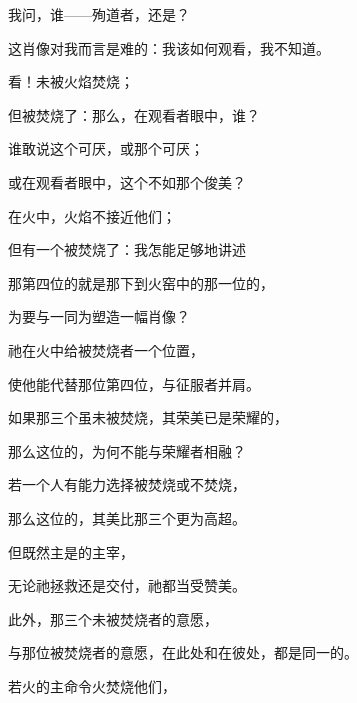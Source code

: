 我问，谁——殉道者，还是？\par

这肖像对我而言是难的：我该如何观看，我不知道。\par

看！未被火焰焚烧；\par

但被焚烧了：那么，在观看者眼中，谁？\par

谁敢说这个可厌，或那个可厌；\par

或在观看者眼中，这个不如那个俊美？\par

在火中，火焰不接近他们；\par

但有一个被焚烧了：我怎能足够地讲述\par

那第四位的就是那下到火窑中的那一位的，\par

为要与一同为塑造一幅肖像？\par

祂在火中给被焚烧者一个位置，\par

使他能代替那位第四位，与征服者并肩。\par

如果那三个虽未被焚烧，其荣美已是荣耀的，\par

那么这位的，为何不能与荣耀者相融？\par

若一个人有能力选择被焚烧或不焚烧，\par

那么这位的，其美比那三个更为高超。\par

但既然主是的主宰，\par

无论祂拯救还是交付，祂都当受赞美。\par

此外，那三个未被焚烧者的意愿，\par

与那位被焚烧者的意愿，在此处和在彼处，都是同一的。\par

若火的主命令火焚烧他们，\par

